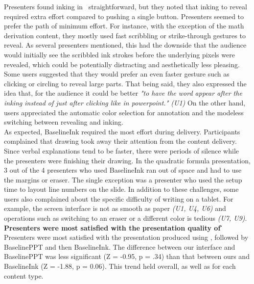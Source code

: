 Presenters found inking in \interface\ straightforward, but they noted that inking to reveal required extra effort compared to pushing a single button. Presenters seemed to prefer the path of minimum effort. For instance, with the exception of the math derivation content, they mostly used fast scribbling or strike-through gestures to reveal. As several presenters mentioned, this had the downside that the audience would initially see the scribbled ink strokes before the underlying pixels were revealed, which could be potentially distracting and aesthetically less pleasing. Some users suggested that they would prefer an even faster gesture such as clicking or circling to reveal large parts. That being said, they also expressed the idea that, for the audience it could be better  \textit{"to have the word appear after the inking instead of just after clicking like in powerpoint." (U1)}  On the other hand, users appreciated the automatic color selection for annotation and the modeless switching between revealing and inking. \\
As expected, BaselineInk required the most effort during delivery. Participants complained that drawing took away their attention from the content delivery. Since verbal explanations tend to be faster, there were periods of silence while the presenters were finishing their drawing. In the quadratic formula presentation, 3 out of the 4 presenters who used BaselineInk ran out of space and had to use the margins or eraser. The single exception was a presenter who used the setup time to layout line numbers on the slide. In addition to these challenges, some users also complained about the specific difficulty of writing on a tablet. For example, the screen interface is not as smooth as paper \textit{(U1, U4, U6)} and operations such as switching to an eraser or a different color is tedious \textit{(U7, U9)}. \\
%
\textbf{Presenters were most satisfied with the presentation quality of \interface\.}
Presenters were most satisfied with the presentation produced using \interface, followed by BaselinePPT and then BaselineInk. The difference between our interface and BaselinePPT was less significant (Z = -0.95, p = .34) than that between ours and BaselineInk (Z = -1.88, p = 0.06). This trend held overall, as well as for each content type.\\
